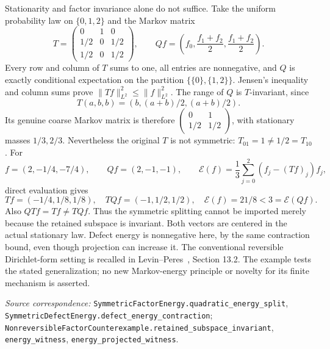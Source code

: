\documentclass[11pt]{article}
\newcommand{\code}[1]{{\small\nolinkurl{#1}}}
\begin{document}
Stationarity and factor invariance alone do not suffice. Take the
uniform probability law on $\{0,1,2\}$ and the Markov matrix
\[
 T=\begin{pmatrix}0&1&0\\1/2&0&1/2\\1/2&0&1/2\end{pmatrix},
 \qquad Qf=\left(f_0,\frac{f_1+f_2}{2},\frac{f_1+f_2}{2}\right).
\]
Every row and column of $T$ sums to one, all entries are nonnegative,
and $Q$ is exactly conditional expectation on the partition
$\{\{0\},\{1,2\}\}$. Jensen's inequality and column sums prove
$\|Tf\|_{L^2}^2\leq\|f\|_{L^2}^2$. The range of $Q$ is $T$-invariant,
since
\[
 T(a,b,b)=(b,(a+b)/2,(a+b)/2).
\]
Its genuine coarse Markov matrix is therefore
$\left(\begin{smallmatrix}0&1\\1/2&1/2\end{smallmatrix}\right)$,
with stationary masses $1/3,2/3$.
Nevertheless the original $T$ is not symmetric:
$T_{01}=1\ne1/2=T_{10}$. For
\[
 f=(2,-1/4,-7/4),\qquad Qf=(2,-1,-1),
 \qquad \mathcal E(f)=\frac13\sum_{j=0}^2(f_j-(Tf)_j)f_j,
\]
direct evaluation gives
\[
 Tf=(-1/4,1/8,1/8),\quad TQf=(-1,1/2,1/2),\quad
 \mathcal E(f)=21/8<3=\mathcal E(Qf).
\]
Also $QTf=Tf\ne TQf$. Thus the symmetric splitting cannot be
imported merely because the retained subspace is invariant. Both
vectors are centered in the actual stationary law. Defect energy is
nonnegative here, by the same contraction bound, even though projection
can increase it. The conventional reversible Dirichlet-form setting
is recalled in Levin--Peres~\cite{LP}, Section 13.2. The example
tests the stated generalization; no new Markov-energy principle or
novelty for its finite mechanism is asserted.
\par\smallskip\begingroup\small\raggedright
\textit{Source correspondence:} \code{SymmetricFactorEnergy.quadratic_energy_split},
\code{SymmetricDefectEnergy.defect_energy_contraction};
\code{NonreversibleFactorCounterexample.retained_subspace_invariant},
\code{energy_witness}, \code{energy_projected_witness}.
\par\endgroup
\end{document}
